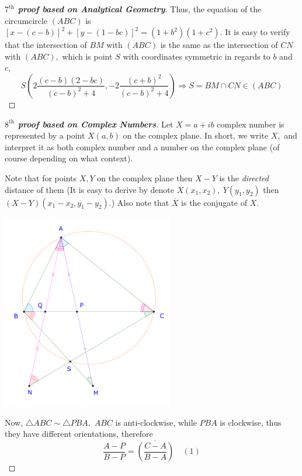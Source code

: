 \documentclass{article}
\begin{document}
\begin{proof}[\textbf{$7^{\text{th}}$ proof based on Analytical Geometry}]
    Thus, the equation of the circumcircle $(ABC)$ is $\left[ x - (c-b) \right]^2 + \left[ y - (1-bc) \right]^2 = (1+b^2)(1+c^2).$
    It is easy to verify that the intersection of $BM$ with $(ABC)$ is the same as the intersection of $CN$ with $(ABC),$ which is
    point $S$ with coordinates symmetric in regards to $b$ and $c,$
    \[
        S \left( 2\frac{(c-b)(2-bc)}{(c-b)^2+4}, -2\frac{(c+b)^2}{(c-b)^2+4} \right)
        \Rightarrow S = BM \cap CN \in (ABC)
    \]
\end{proof}

\newpage

\begin{proof}[\textbf{$8^{\text{th}}$ proof based on Complex Numbers}]
    Let $X = a+ib$ complex number is represented by a point $X(a,b)$ on the complex plane.
    In short, we write $X,$ and interpret it as both complex number and a number on the complex plane
    (of course depending on what context).

    Note that for points $X, Y$ on the complex plane then $X-Y$ is the \textit{directed} distance of them
    (It is easy to derive by denote $X(x_1, x_2),\ Y(y_1,y_2)$ then $(X-Y)(x_1-x_2,y_1-y_2)$.)
    Also note that $\overline{X}$ is the conjugate of $X.$

    \begin{center}
        \includegraphics[width=7.5cm]{./svg/pdf/ot-22-23-4-e2-s1.pdf}
    \end{center}

    Now, $\triangle ABC \sim \triangle PBA,$ $ABC$ is anti-clockwise, while $PBA$ is clockwise, thus
    they have different orientations, therefore
    \[
        \frac{A-P}{B-P} = \overline{ \left(\frac{C-A}{B-A}\right) } \quad (1)
    \]


\end{proof}
\end{document}
